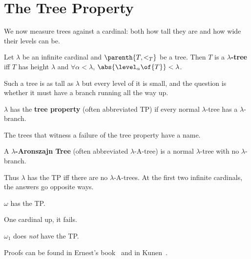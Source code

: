 \section{The Tree Property}

We now measure trees against a cardinal: both how tall they are and how wide their levels can be.

\begin{boxdefinition}
    Let $\lambda$ be an infinite cardinal and $\parenth{T, <_T}$ be a tree. Then $T$ is a \textbf{$\lambda$-tree} iff $T$ has height $\lambda$ and $\forall \alpha < \lambda$, $\abs{\level_{\alpha}\of{T}} < \lambda$.
\end{boxdefinition}

Such a tree is as tall as $\lambda$ but every level of it is small, and the question is whether it must have a branch running all the way up.

\begin{boxdefinition}
    $\lambda$ has the \textbf{tree property} (often abbreviated TP) if every normal $\lambda$-tree has a $\lambda$-branch.
\end{boxdefinition}

The trees that witness a failure of the tree property have a name.

\begin{boxdefinition}
    A \textbf{$\lambda$-Aronszajn Tree} (often abbreviated $\lambda$-A-tree) is a normal $\lambda$-tree with no $\lambda$-branch.
\end{boxdefinition}

Thus $\lambda$ has the TP iff there are no $\lambda$-A-trees. At the first two infinite cardinals, the answers go opposite ways.

\begin{boxtheorem}[K\H{o}nig]
    $\omega$ has the TP.
\end{boxtheorem}

One cardinal up, it fails.

\begin{boxtheorem}[Aronszajn]
    $\omega_1$ does \textit{not} have the TP.
\end{boxtheorem}

Proofs can be found in Ernest's book~\cite[Theorems 5.17 and 5.30]{Schimmerling} and in Kunen~\cite[Chapter II, Lemma 5.7 and Theorem 5.9]{Kunen}.
